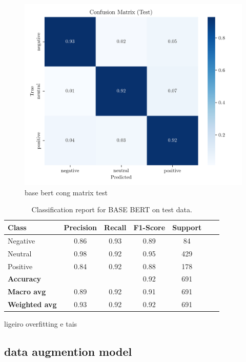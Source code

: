 \documentclass[conference]{IEEEtran}
\begin{document}
\begin{figure}[H]
    \centering
    \includegraphics[width=1\linewidth]{assets/base_bert_confusion_matrix_Test.png}
    \caption{base bert cong matrix test}
    \label{fig:base_bert_confusion_matrix_Test}
\end{figure}

\begin{table}[H]
\centering
\caption{Classification report for BASE BERT on test data.}
\label{cr_basebert_test}
\begin{tabular}{lcccccc}
\toprule
\textbf{Class} & \textbf{Precision} & \textbf{Recall} & \textbf{F1-Score} & \textbf{Support} \\
\midrule
Negative & 0.86 & 0.93 & 0.89 & 84 \\
Neutral & 0.98 & 0.92 & 0.95 & 429 \\
Positive & 0.84 & 0.92 & 0.88 & 178 \\
\midrule
\textbf{Accuracy} &  &  & 0.92 & 691 \\
\textbf{Macro avg} & 0.89 & 0.92 & 0.91 & 691 \\
\textbf{Weighted avg} & 0.93 & 0.92 & 0.92 & 691 \\
\bottomrule
\end{tabular}
\end{table}

ligeiro overfitting e tais

\subsection{data augmention model}
\end{document}
